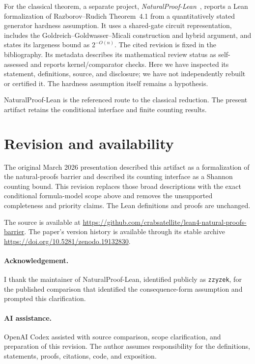 \documentclass[11pt]{amsart}
\theoremstyle{plain}
\theoremstyle{definition}
\begin{document}
For the classical theorem, a separate project,
\emph{NaturalProof-Lean}~\cite{Zzyzek2026}, reports a Lean formalization
of Razborov--Rudich Theorem~4.1 from a quantitatively stated generator
hardness assumption. It uses a shared-gate circuit representation,
includes the Goldreich--Goldwasser--Micali construction and hybrid
argument, and states its largeness bound as $2^{-O(n)}$.
The cited revision is fixed in the bibliography.
Its metadata describes its mathematical review status as
self-assessed and reports kernel/comparator checks.
Here we have inspected its statement, definitions, source, and
disclosure; we have not independently rebuilt or certified it.
The hardness assumption itself remains a hypothesis.

NaturalProof-Lean is the referenced route to the classical reduction.
The present artifact retains the conditional interface and finite
counting results.

\section{Revision and availability}

The original March 2026 presentation described this artifact as a
formalization of the natural-proofs barrier and described its counting
interface as a Shannon counting bound. This revision replaces those
broad descriptions with the exact conditional formula-model scope
above and removes the unsupported completeness and priority claims.
The Lean definitions and proofs are unchanged.

The source is available at
\url{https://github.com/crabsatellite/lean4-natural-proofs-barrier}.
The paper's version history is available through its stable archive
\url{https://doi.org/10.5281/zenodo.19132830}.

\paragraph{Acknowledgement.}
I thank the maintainer of NaturalProof-Lean, identified publicly as
\texttt{zzyzek}, for the published comparison that identified the
consequence-form assumption and prompted this clarification.

\paragraph{AI assistance.}
OpenAI Codex assisted with source comparison, scope clarification,
and preparation of this revision. The author assumes responsibility
for the definitions, statements, proofs, citations, code, and exposition.
\end{document}
